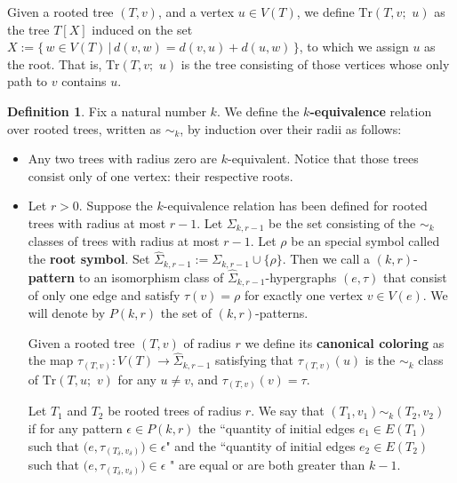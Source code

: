\documentclass[12pt,notitlepage,a4paper]{article}
\theoremstyle{definition}
\newtheorem{definition}{Definition}[section]
\begin{document}
%
Given a rooted tree $(T, v)$, and a vertex $u\in V(T)$, 
we define $\mathrm{Tr}(T,v;\,\, u)$ as the tree $T[X]$ induced on the
set $X:=\{ \, w\in V(T) \, | \, d(v,w)=d(v,u)+ d(u,w) \,  \}
$, to which we assign $u$ as the root.
That is, $\mathrm{Tr}(T,v;\,\, u)$ is the tree consisting of those vertices
whose only path to $v$ contains $u$.
\par


\begin{definition}

Fix a natural number $k$. We define the
\textbf{$k$-equivalence} relation over rooted trees, 
written as $\sim_k$, by induction over their radii as follows:

\begin{itemize}[leftmargin=*]
	\item Any two trees with radius zero are $k$-equivalent.
	Notice that those trees
	consist only of one vertex: their respective roots.
	
	\item Let $r>0$.
	Suppose the $k$-equivalence relation has been
	defined for rooted trees with radius at most $r-1$. Let $\Sigma_{k,r-1}$
	be the set consisting of the $\sim_k$ classes of trees
	with radius at most $r-1$. Let $\rho$ be an special symbol called the
	\textbf{root symbol}. Set $\widehat{\Sigma}_{k,r-1}:=\Sigma_{k,r-1}\cup \{\rho\}$.
	Then we call a $(k,r)$-\textbf{pattern} to an isomorphism class
	of $\widehat{\Sigma}_{k,r-1}$-hypergraphs 
	$(e,\tau)$ that consist of only one edge and satisfy 
	$\tau(v)=\rho$ for exactly one vertex $v\in V(e)$. We will
	denote by $P(k,r)$ the set of $(k,r)$-patterns. \par
	Given a rooted tree $(T,v)$ of radius $r$
	we define its \textbf{canonical coloring}
	as the map 
	$\tau_{(T,v)}: V(T)\rightarrow \widehat{\Sigma}_{k,r-1}$ satisfying that
	 $\tau_{(T,v)}(u)$ is the
	$\sim_k$ class of $\mathrm{Tr}(T,u;\, \,v)$
	for any $u\neq v$, and $\tau_{(T,v)}(v)=\tau$. \par
	Let $T_1$ and $T_2$ be rooted trees of radius $r$. 
	We say that $(T_1,v_1)\sim_k (T_2,v_2)$ 
	if for any pattern $\epsilon\in P(k,r)$	the
	``quantity of initial edges $e_1\in E(T_1)$ such that
	$\big(e,\tau_{(T_\delta,v_\delta)}\big) \in \epsilon$" 
	and the
	``quantity of initial edges $e_2\in E(T_2)$ such that
	$\big(e,\tau_{(T_\delta,v_\delta)}\big)\in \epsilon$
	" are equal or
	are both greater than $k-1$.
\end{itemize}

\end{definition}
\end{document}
